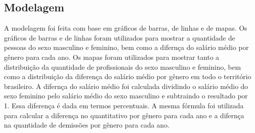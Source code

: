 \subsection{Modelagem}

A modelagem foi feita com base em gráficos de barras, de linhas e de mapas. Os gráficos de barras e de linhas foram utilizados para mostrar a quantidade de pessoas do sexo masculino e feminino, bem como a difernça do salário médio por gênero para cada ano. Os mapas foram utilizados para mostrar tanto a distribuição da quantidade de profissionais do sexo masculino e feminino, bem como a distribuição da diferença do salário médio por gênero em todo o território brasileiro. A difernça do salário médio foi calculada dividindo o salário médio do sexo feminino pelo salário médio do sexo masculino e subtraindo o resultado por 1. Essa diferença é dada em termos percentuais. A mesma fórmula foi utilizada para calcular a diferença no quantitativo por gênero para cada ano e a difernça na quantidade de demissões por gênero para cada ano.
